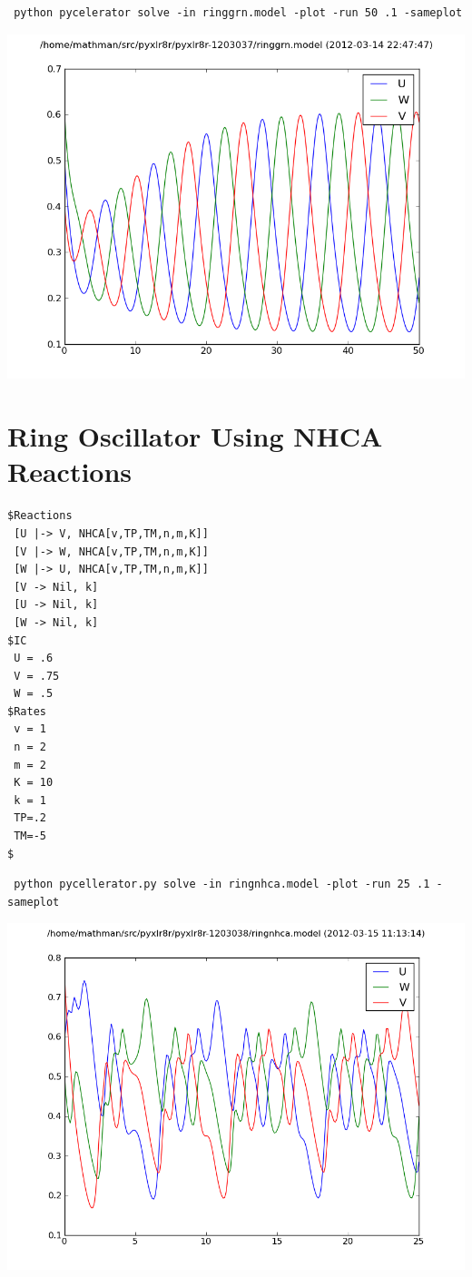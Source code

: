 \begin{lstlisting}
 python pycelerator solve -in ringgrn.model -plot -run 50 .1 -sameplot
\end{lstlisting}

\begin{center}
\includegraphics[width=.7\textwidth]{ringgrn.png}
\end{center}

\clearpage
 

\section[Ring Oscillator (NHCA)]{Ring Oscillator Using NHCA Reactions}

\begin{lstlisting}
$Reactions
 [U |-> V, NHCA[v,TP,TM,n,m,K]]
 [V |-> W, NHCA[v,TP,TM,n,m,K]]
 [W |-> U, NHCA[v,TP,TM,n,m,K]]
 [V -> Nil, k]
 [U -> Nil, k]
 [W -> Nil, k]
$IC
 U = .6
 V = .75
 W = .5
$Rates
 v = 1
 n = 2
 m = 2
 K = 10
 k = 1
 TP=.2
 TM=-5
$
\end{lstlisting}

\begin{lstlisting}
 python pycellerator.py solve -in ringnhca.model -plot -run 25 .1 -sameplot
\end{lstlisting}

\begin{center}
\includegraphics[width=.7\textwidth]{ringnhca.png}
\end{center}

